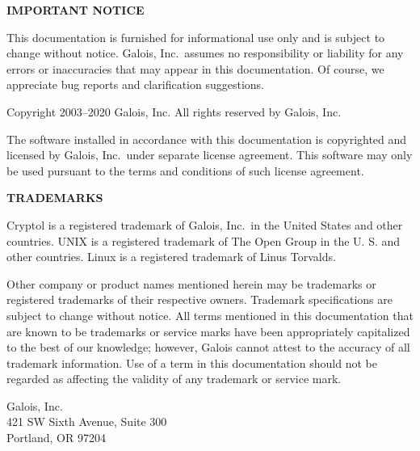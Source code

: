 \noindent
{\bf IMPORTANT NOTICE}

{\small
  This documentation is furnished for informational use only
  and is subject to change without notice. Galois, Inc.~assumes no
  responsibility or liability for any errors or inaccuracies that may
  appear in this documentation. Of course, we appreciate bug reports
  and clarification suggestions.

  Copyright 2003--2020 Galois, Inc. All rights reserved by Galois,
  Inc.

  The software installed in accordance with this documentation is
  copyrighted and licensed by Galois, Inc.~under separate license
  agreement. This software may only be used pursuant to the terms and
  conditions of such license agreement.}

\noindent
{\bf TRADEMARKS}

{\small 
  Cryptol is a registered trademark of Galois, Inc.~in the United
  States and other countries. UNIX is a registered trademark of The
  Open Group in the U. S.  and other countries. Linux is a registered
  trademark of Linus Torvalds.

  Other company or product names mentioned herein may be trademarks or
  registered trademarks of their respective owners. Trademark
  specifications are subject to change without notice. All terms
  mentioned in this documentation that are known to be trademarks or
  service marks have been appropriately capitalized to the best of our
  knowledge; however, Galois cannot attest to the accuracy of all
  trademark information. Use of a term in this documentation should
  not be regarded as affecting the validity of any trademark or
  service mark.

\vspace{0.5in}
\noindent
Galois, Inc.\\
421 SW Sixth Avenue, Suite 300 \\
Portland, OR 97204
}


